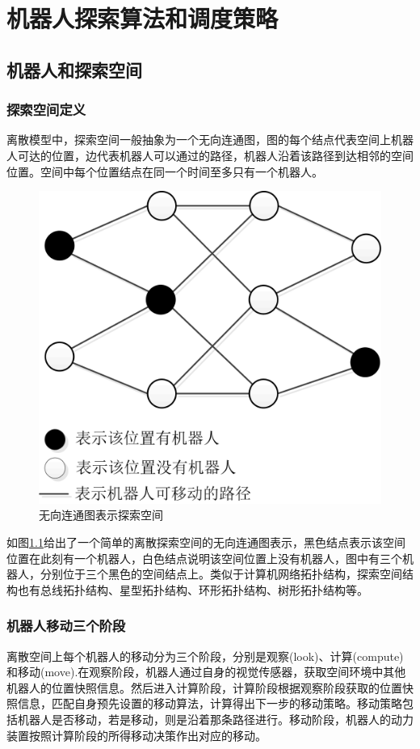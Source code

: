 \chapter{机器人探索算法和调度策略}

\section{机器人和探索空间}


\subsection{探索空间定义}
离散模型中，探索空间一般抽象为一个无向连通图，图的每个结点代表空间上机器人可达的位置，边代表机器人可以通过的路径，机器人沿着该路径到达相邻的空间位置。空间中每个位置结点在同一个时间至多只有一个机器人。

\begin{figure}[!hbt]
	\centering
	\includegraphics[width=3 in]{fig/normalspace.png}
	\caption{无向连通图表示探索空间}
	\label{fig:normalspace}
\end{figure}

如图\ref{fig:normalspace}给出了一个简单的离散探索空间的无向连通图表示，黑色结点表示该空间位置在此刻有一个机器人，白色结点说明该空间位置上没有机器人，图中有三个机器人，分别位于三个黑色的空间结点上。类似于计算机网络拓扑结构，探索空间结构也有总线拓扑结构、星型拓扑结构、环形拓扑结构、树形拓扑结构等。

\subsection{机器人移动三个阶段}
离散空间上每个机器人的移动分为三个阶段，分别是观察(look)、计算(compute)和移动(move).在观察阶段，机器人通过自身的视觉传感器，获取空间环境中其他机器人的位置快照信息。然后进入计算阶段，计算阶段根据观察阶段获取的位置快照信息，匹配自身预先设置的移动算法，计算得出下一步的移动策略。移动策略包括机器人是否移动，若是移动，则是沿着那条路径进行。移动阶段，机器人的动力装置按照计算阶段的所得移动决策作出对应的移动。

